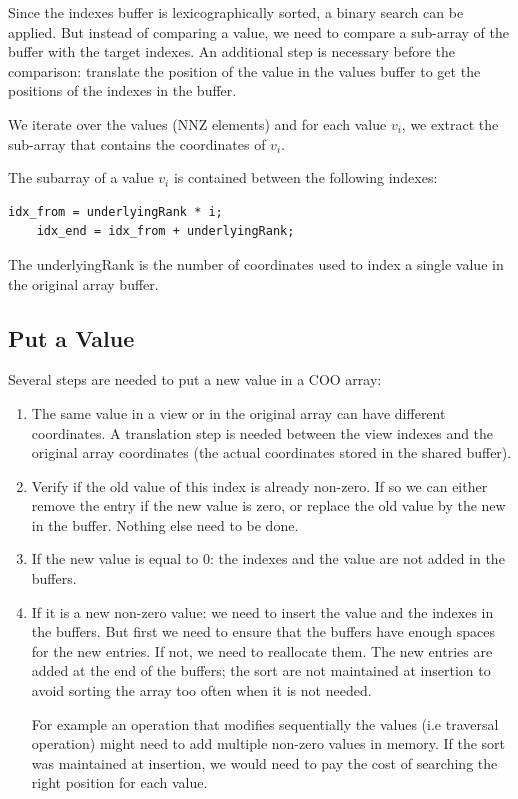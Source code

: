 Since the indexes buffer is lexicographically sorted, a binary search can be applied. But instead of comparing a value, we need to compare a sub-array of the buffer with the target indexes. An additional step is necessary before the comparison: translate the position of the value in the values buffer to get the positions of the indexes in the buffer.

We iterate over the values (NNZ elements) and for each value $v_{i}$, we extract the sub-array that contains the coordinates of $v_{i}$.

The subarray of a value $v_{i}$ is contained between the following indexes: 
\begin{lstlisting}[style=nonumbers]
	idx_from = underlyingRank * i;
	idx_end = idx_from + underlyingRank;
\end{lstlisting}

The underlyingRank is the number of coordinates used to index a single value in the original array buffer.



\subsection{Put a Value}

Several steps are needed to put a new value in a COO array:
\begin{enumerate}
	\item The same value in a view or in the original array can have different coordinates. A translation step is needed between the view indexes and the original array coordinates (the actual coordinates stored in the shared buffer).
	\item Verify if the old value of this index is already non-zero. If so we can either remove the entry if the new value is zero, or replace the old value by the new in the buffer. Nothing else need to be done.
	\item If the new value is equal to 0: the indexes and the value are not added in the buffers.
	\item If it is a new non-zero value: we need to insert the value and the indexes in the buffers. But first we need to ensure that the buffers have enough spaces for the new entries. If not, we need to reallocate them. The new entries are added at the end of the buffers; the sort are not maintained at insertion to avoid sorting the array too often when it is not needed. 
	
	For example an operation that modifies sequentially the values (i.e traversal operation) might need to add multiple non-zero values in memory. If the sort was maintained at insertion, we would need to pay the cost of searching the right position for each value. 
\end{enumerate}


